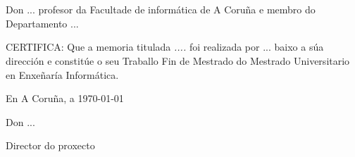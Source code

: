 %
%
\section*{}

\begin{center}
	Don \textsc{...} profesor da Facultade de informática de A Coruña e membro do Departamento ...

\end{center}


\vspace{3cm}

	CERTIFICA: Que a memoria titulada {\it ....} foi realizada por
	\textsc{...} baixo a súa dirección e constitúe o seu Traballo Fin de
	Mestrado do Mestrado Universitario en Enxeñaría Informática.
	
	\vspace{3cm}
	
	En A Coruña, a {\today}
	
\vspace{2cm}

\begin{center}
	Don \textsc{...}
	
	Director do proxecto
\end{center}